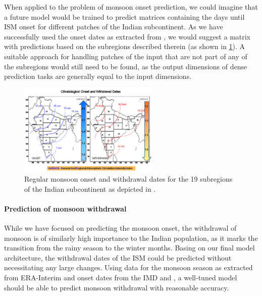 When applied to the problem of monsoon onset prediction, we could imagine that a future model would be trained to predict matrices containing the days until ISM onset for different patches of the Indian subcontinent. As we have successfully used the onset dates as extracted from \citet{Singh.2009}, we would suggest a matrix with predictions based on the subregions described therein (as shown in \cref{fig:singh_subregions}). A suitable approach for handling patches of the input that are not part of any of the subregions would still need to be found, as the output dimensions of dense prediction tasks are generally equal to the input dimensions.

\begin{figure}[H]
  \centering
  \includegraphics[width=0.6\textwidth]{./99_appendix/img/singh_subregions.png}
  \caption{Regular monsoon onset and withdrawal dates for the 19 subregions of the Indian subcontinent as depicted in \citet{Singh.2009}.}
  \label{fig:singh_subregions}
\end{figure}

\paragraph{Prediction of monsoon withdrawal}
While we have focused on predicting the monsoon onset, the withdrawal of monsoon is of similarly high importance to the Indian population, as it marks the transition from the rainy season to the winter months. Basing on our final model architecture, the withdrawal dates of the ISM could be predicted without necessitating any large changes. Using data for the monsoon season as extracted from ERA-Interim and onset dates from the IMD and \citet{Singh.2009}, a well-tuned model should be able to predict monsoon withdrawal with reasonable accuracy.
